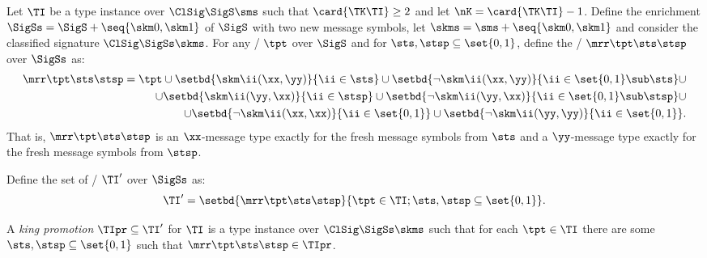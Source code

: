 \begin{definition}
Let $\TI$ be a type instance over $\ClSig\SigS\sms$ such that
$\card{\TK\TI}\geq2$ and let $\nK = \card{\TK\TI}-1$.
Define the enrichment
$\SigSs = \SigS + \seq{\skm0,\skm1}$
of $\SigS$ with two new message symbols,
let $\skms = \sms + \seq{\skm0,\skm1}$
and consider the classified signature $\ClSig\SigSs\skms$.
For any \twotype/ $\tpt$ over $\SigS$
and for $\sts,\stsp\subseteq\set{0,1}$,
define the \twotype/ $\mrr\tpt\sts\stsp$ over $\SigSs$ as:
\begin{align*}
\mrr\tpt\sts\stsp = \tpt
\cup\setbd{\skm\ii(\xx,\yy)}{\ii\in\sts}
\cup\setbd{\lnot\skm\ii(\xx,\yy)}{\ii\in\set{0,1}\sub\sts}\cup \\
\cup\setbd{\skm\ii(\yy,\xx)}{\ii\in\stsp}
\cup\setbd{\lnot\skm\ii(\yy,\xx)}{\ii\in\set{0,1}\sub\stsp}\cup \\
\cup\setbd{\lnot\skm\ii(\xx,\xx)}{\ii\in\set{0,1}}
\cup\setbd{\lnot\skm\ii(\yy,\yy)}{\ii\in\set{0,1}}.
\end{align*}
That is, $\mrr\tpt\sts\stsp$ is an $\xx$-message type exactly for the fresh
message symbols from $\sts$ and a $\yy$-message type exactly for the fresh
message symbols from $\stsp$.

Define the set of \twotypes/ $\TI'$ over $\SigSs$ as:
\[
\TI' = \setbd{\mrr\tpt\sts\stsp}{\tpt\in\TI;\sts,\stsp\subseteq\set{0,1}}.
\]

A \emph{king promotion} $\TIpr\subseteq\TI'$ for $\TI$ is a type instance over
$\ClSig\SigSs\skms$ such that for each $\tpt\in\TI$ there are some
$\sts,\stsp\subseteq\set{0,1}$ such that $\mrr\tpt\sts\stsp\in\TIpr$.
\end{definition}

